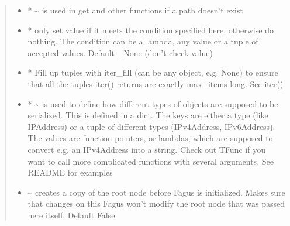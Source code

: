 \documentclass[a4paper,10pt,english]{sphinxmanual}
\begin{document}
\begin{fulllineitems}
\begin{fulllineitems}
\begin{quote}
\begin{description}
\begin{itemize}
\item {}
\sphinxAtStartPar
{} \textendash{} * \textasciitilde{} is used in get and other functions if a path doesn’t exist

\item {}
\sphinxAtStartPar
{} \textendash{} * only set value if it meets the condition specified here, otherwise do nothing. The condition can be
a lambda, any value or a tuple of accepted values. Default \_None (don’t check value)

\item {}
\sphinxAtStartPar
{} \textendash{} * Fill up tuples with iter\_fill (can be any object, e.g. None) to ensure that all the tuples
iter() returns are exactly max\_items long. See iter()

\item {}
\sphinxAtStartPar
{} \textendash{} * \textasciitilde{} is used to define how different types of objects are supposed to be serialized. This is
defined in a dict. The keys are either a type (like IPAddress) or a tuple of different types
(IPv4Address, IPv6Address). The values are function pointers, or lambdas, which are supposed to convert
e.g. an IPv4Address into a string. Check out TFunc if you want to call more complicated functions with
several arguments. See README for examples

\item {}
\sphinxAtStartPar
{} \textendash{} \textasciitilde{} creates a copy of the root node before Fagus is initialized. Makes sure that changes on this Fagus
won’t modify the root node that was passed here itself. Default False

\end{itemize}

\end{description}\end{quote}

\end{fulllineitems}



\end{fulllineitems}
\end{document}
